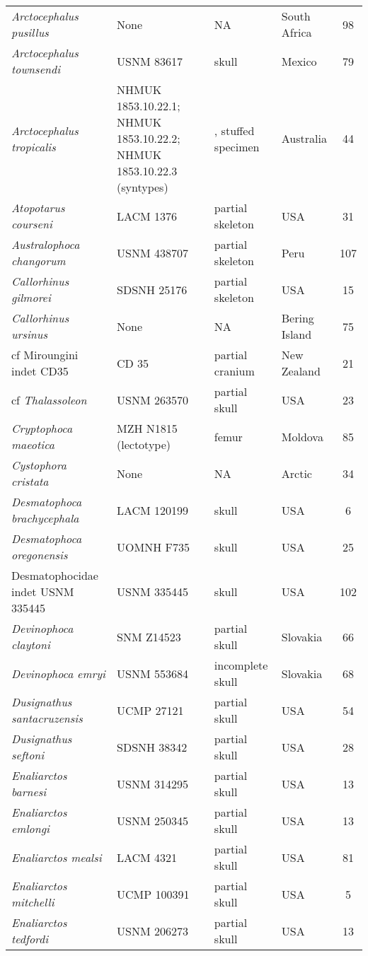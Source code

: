 \begin{longtable}{p{}p{}p{}lc}
\textit{Arctocephalus pusillus} & 	None & 	NA & South Africa & 	98\\
\textit{Arctocephalus townsendi} & 	USNM 83617 & skull & 	Mexico & 79\\
\textit{Arctocephalus tropicalis} & NHMUK 1853.10.22.1; NHMUK 1853.10.22.2; NHMUK 1853.10.22.3 (syntypes) & , stuffed specimen & 	Australia & 44\\
\textit{Atopotarus courseni} & 	LACM 1376 & partial skeleton & 	USA & 31\\
\textit{Australophoca changorum} & 	USNM 438707 & partial skeleton & 	Peru & 	107\\
\textit{Callorhinus gilmorei} & 	SDSNH 25176 & partial skeleton & 	USA & 15\\
\textit{Callorhinus ursinus} & 	None & 	NA & 	Bering Island & 75\\
cf Miroungini indet CD35	& CD 35 & 	partial cranium & 	New Zealand & 21\\
cf \textit{Thalassoleon} & USNM 263570 & partial skull & USA & 23\\
\textit{Cryptophoca maeotica} & MZH N1815 (lectotype)	& femur	& Moldova & 85\\
\textit{Cystophora cristata} & 	None & 	NA & 	Arctic & 34\\
\textit{Desmatophoca brachycephala} &	LACM 120199 & 	skull & 	USA & 6\\
\textit{Desmatophoca oregonensis} &	UOMNH F735 & 	skull & 	USA & 25\\
Desmatophocidae indet USNM 335445 &	USNM 335445 & 	skull & 	USA & 102\\
\textit{Devinophoca claytoni} &	SNM Z14523 & 	partial skull & 	Slovakia & 66\\
\textit{Devinophoca emryi} &	USNM 553684 & 	incomplete skull & 	Slovakia & 	68\\
\textit{Dusignathus santacruzensis} &	UCMP 27121 & 	partial skull & 	USA & 54\\
\textit{Dusignathus seftoni} &	SDSNH 38342 & 	partial skull & 	USA & 28\\
\textit{Enaliarctos barnesi} &	USNM 314295 & 	partial skull & 	USA & 13\\
\textit{Enaliarctos emlongi} &	USNM 250345 & 	partial skull & 	USA & 13\\
\textit{Enaliarctos mealsi} &	LACM 4321 & 	partial skull & 	USA & 81\\
\textit{Enaliarctos mitchelli} &	UCMP 100391 & 	partial skull & 	USA & 5\\
\textit{Enaliarctos tedfordi} &	USNM 206273 & 	partial skull & 	USA & 13\\

\end{longtable}
